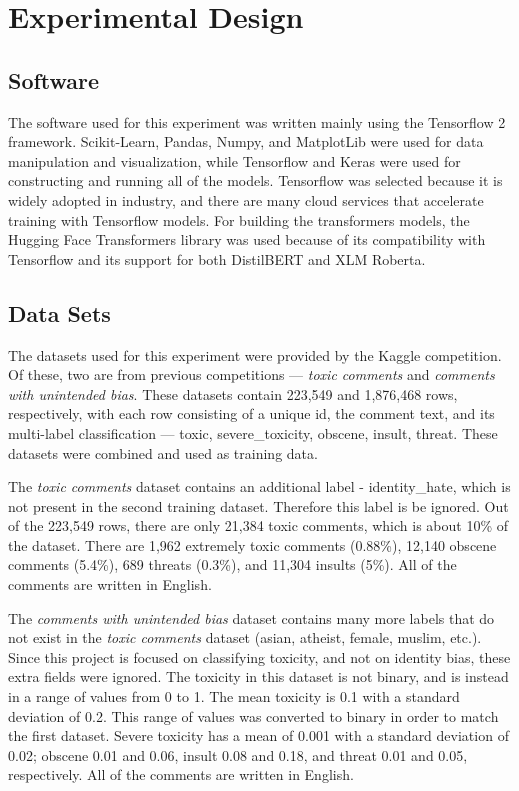 \documentclass{article}
\begin{document}
\section{Experimental Design}

\subsection{Software}

The software used for this experiment was written mainly using the Tensorflow 2 framework. Scikit-Learn, Pandas, Numpy, and MatplotLib were used for data manipulation and visualization, while Tensorflow and Keras were used for constructing and running all of the models. Tensorflow was selected because it is widely adopted in industry, and there are many cloud services that accelerate training with Tensorflow models. For building the transformers models, the Hugging Face Transformers library was used because of its compatibility with Tensorflow and its support for both DistilBERT and XLM Roberta.

\subsection{Data Sets}

The datasets used for this experiment were provided by the Kaggle competition. Of these, two are from previous competitions --- \textit{toxic comments} and \textit{comments with unintended bias}. These datasets contain 223,549 and 1,876,468 rows, respectively, with each row consisting of a unique id, the comment text, and its multi-label classification --- toxic, severe\_toxicity, obscene, insult, threat. These datasets were combined and used as training data.

The \textit{toxic comments} dataset contains an additional label - identity\_hate, which is not present in the second training dataset. Therefore this label is be ignored. Out of the 223,549 rows, there are only 21,384 toxic comments, which is about 10\% of the dataset. There are 1,962 extremely toxic comments (0.88\%), 12,140 obscene comments (5.4\%), 689 threats (0.3\%), and 11,304 insults (5\%). All of the comments are written in English.

The \textit{comments with unintended bias} dataset contains many more labels that do not exist in the \textit{toxic comments} dataset (asian, atheist, female, muslim, etc.). Since this project is focused on classifying toxicity, and not on identity bias, these extra fields were ignored. The toxicity in this dataset is not binary, and is instead in a range of values from 0 to 1. The mean toxicity is 0.1 with a standard deviation of 0.2. This range of values was converted to binary in order to match the first dataset. Severe toxicity has a mean of 0.001 with a standard deviation of 0.02; obscene 0.01 and 0.06, insult 0.08 and 0.18, and threat 0.01 and 0.05, respectively. All of the comments are written in English.
\end{document}

